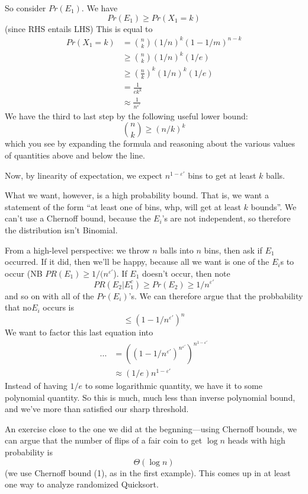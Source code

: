 \documentclass{article}
\begin{document}
So consider $Pr(E_1)$.
We have
$$
Pr(E_1) \geq Pr(X_1 = k)
$$
(since RHS entails LHS)
This is equal to 
\begin{align}
Pr(X_1 = k)
&= {n \choose k} 
\left(1/n \right)^k
(1 - 1/m)^{n-k}
\\
&\geq
{n\choose k} (1/n)^k
(1/e)
\\
&\geq \left(
	\frac{n}{k}
\right)^k
(1/n)^k
(1/e)
\\
&=
\frac{1}{e k^k}
\\
&\approx \frac{1}{n^{\varepsilon'}}
\end{align}
We have the third to last step by the following useful lower bound:
$$
{n\choose k} \geq (n/k)^k
$$
which you see by expanding the formula and reasoning about the various values of quantities above and below the line.

Now, by linearity of expectation, we expect
$n^{1-{\varepsilon'}}$ bins to get at least $k$ balls.

What we want, however, is a high probability bound.
That is, we want a statement of the form ``at least one of  bins, whp, will get at least $k$ bounds''.
We can't use a Chernoff bound, because the $E_i$'s are not independent, so therefore the distribution isn't Binomial.

From a high-level perspective: we throw $n$ balls into $n$ bins, then ask if $E_1$ occurred.
If it did, then we'll be happy, because all we want is one of the $E_i$s to occur (NB $PR(E_1) \geq 1 / (n^{\varepsilon'}$).
If $E_1$ doesn't occur, then note
$$
PR(E_2 | E_1^c) \geq Pr(E_2) \geq 1 / {n^{\varepsilon'}}
$$
and so on with all of the $Pr(E_i)$'s.
We can therefore argue that the probbability that no$ E_i$ occurs is
$$
\leq (1 - 1/n^{\varepsilon'})^n
$$
We want to factor this last equation into
\begin{align}
...&=
((1 - 1/n^{\varepsilon'}) ^ {n^{\varepsilon'}} ) ^ {n^{1 - \varepsilon'}}
\\
&\approx
(1/e) n^{1 - \varepsilon'}
\end{align}
Instead of having $1/e$ to some logarithmic quantity, we have it to some polynomial quantity.
So this is much, much less than inverse polynomial bound, and we've more than satisfied our sharp threshold.

An exercise close to the one we did at the begnning---using Chernoff bounds,
we can argue that the number of flips of a fair coin to get $\log n$ heads
with high probability is
$$
\Theta(\log n)
$$
(we use Chernoff bound (1), as in the first example).
This comes up in at least one way to analyze randomized Quicksort.
\end{document}
